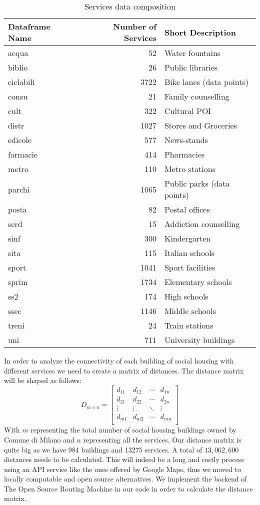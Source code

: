 \documentclass[11pt, titlepage]{article}
\begin{document}
\begin{table}
	\centering
	\begin{tabular}{lrl}
		\toprule
		Dataframe Name&Number of Services&Short Description\\
		\midrule
		acqua&52& Water fountains\\
		biblio&26& Public libraries\\
		ciclabili&3722&Bike lanes (data points)\\
		consu&21&Family counselling\\
		cult&	322&Cultural POI\\
		distr&	1027&Stores and Groceries\\
		edicole&	577&News-stands\\
		farmacie&	414& Pharmacies\\
		metro&	110& Metro stations\\
		parchi&	1065& Public parks (data points)\\
		posta&	82& Postal offices\\
		serd&	15& Addiction counselling\\
		sinf&	300& Kindergarten\\ 
		sita&	115&Italian schools\\
		sport&	1041& Sport facilities\\
		sprim&	1734&Elementary schools\\
		ss2&174&High schools\\
		ssec&1146&Middle schools\\
		treni&24&Train stations\\
		uni&711&University buildings\\
		
		\bottomrule
	\end{tabular}
	\label{servtab}
	\caption{Services data composition}
\end{table}

In order to analyze the connectivity of each building of social housing with different services we need to create a matrix of distances. The distance matrix will be shaped as follows:
\[
D_{m\times n} =
\left[ {\begin{array}{cccc}
		d_{11} & d_{12} & \cdots & d_{1n}\\
		d_{21} & d_{22} & \cdots & d_{2n}\\
		\vdots & \vdots & \ddots & \vdots\\
		d_{m1} & d_{m2} & \cdots & d_{mn}\\
\end{array} } \right]
\]
With $m$ representing the total number of social housing buildings owned by Comune di Milano and $n$ representing all the services. Our distance matrix is quite big as we have 984 buildings and 13275 services. A total of $13,062,600$ distances needs to be calculated. This will indeed be a long and costly process using an API service like the ones offered by Google Maps, thus we moved to locally computable and open source alternatives. We implement the backend of The Open Source Routing Machine \parencite{luxen-vetter-2011} in our code in order to calculate the distance matrix. 
\end{document}
